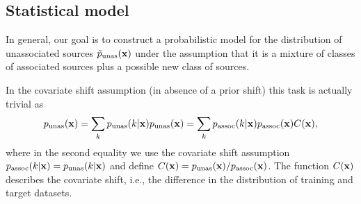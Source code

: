 \documentclass[12pt, a4paper]{article}
\newcommand{\be}{\begin{equation}}
\newcommand{\ee}{\end{equation}}
\newcommand{\bx}{{\bf x}}
\begin{document}
\subsection{Statistical model}
\label{sec:stat-model}

In general, our goal is to construct a probabilistic model for the distribution of unassociated sources $\tilde{p}_{\rm unas}(\bx)$ under the assumption that it is a mixture of classes of associated sources plus a possible new class of sources.

In the covariate shift assumption (in absence of a prior shift) this task is actually trivial as
\be
\label{eq:cov0}
p_{\rm unas}(\bx) 
= \sum_k p_{\rm unas}(k|\bx) p_{\rm unas}(\bx) 
= \sum_k p_{\rm assoc}(k|\bx) p_{\rm assoc}(\bx) C(\bx),
\ee
where in the second equality we use the covariate shift assumption $p_{\rm assoc}(k|\bx) = p_{\rm unas}(k|\bx)$ and define $C(\bx) = p_{\rm unas}(\bx) / p_{\rm assoc}(\bx)$.
The function $C(\bx)$ describes the covariate shift, i.e., the difference in the distribution of training and target datasets.
\end{document}

